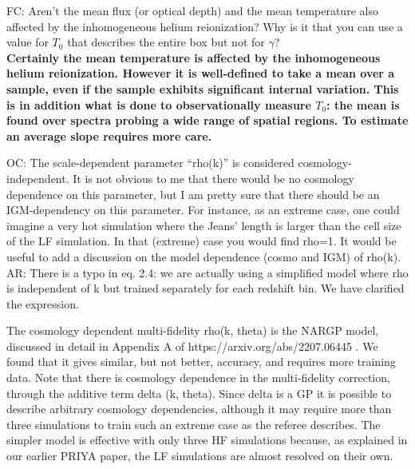 \documentclass[12pt]{article}
\begin{document}
FC: Aren’t the mean flux (or optical depth) and the mean temperature also affected by the inhomogeneous helium reionization? Why is it that you can use a value for $T_0$ that describes the entire box but not for $\gamma$?\\

\textbf{Certainly the mean temperature is affected by the inhomogeneous helium reionization. However it is well-defined to take a mean over a sample, even if the sample exhibits significant internal variation. This is in addition what is done to observationally measure $T_0$: the mean is found over spectra probing a wide range of spatial regions. To estimate an average slope requires more care.}\\

\hrulefill \newline

OC: The scale-dependent parameter “rho(k)” is considered cosmology-independent. It is not obvious to me that there would be no cosmology dependence on this parameter, but I am pretty sure that there should be an IGM-dependency on this parameter. For instance, as an extreme case, one could imagine a very hot simulation where the Jeans’ length is larger than the cell size of the LF simulation. In that (extreme) case you would find rho=1. It would be useful to add a discussion on the model dependence (cosmo and IGM) of rho(k).\\

AR: There is a typo in eq. 2.4: we are actually using a simplified model where rho is independent of k but trained separately for each redshift bin. We have clarified the expression.

The cosmology dependent multi-fidelity rho(k, theta) is the NARGP model, discussed in detail in Appendix A of https://arxiv.org/abs/2207.06445 . We found that it gives similar, but not better, accuracy, and requires more training data. Note that there is cosmology dependence in the multi-fidelity correction, through the additive term delta (k, theta). Since delta is a GP it is possible to describe arbitrary cosmology dependencies, although it may require more than three simulations to train such an extreme case as the referee describes. The simpler model is effective with only three HF simulations because, as explained in our earlier PRIYA paper, the LF simulations are almost resolved on their own.\\
\end{document}
